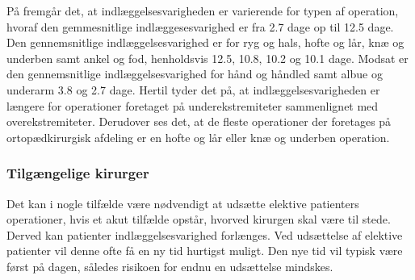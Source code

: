 \noindent
På  fremgår det, at indlæggelsesvarigheden er varierende for typen af operation, hvoraf den gemmesnitlige indlæggesesvarighed er fra 2.7 dage op til 12.5 dage.  Den gennemsnitlige  indlæggelsesvarighed er for ryg og hals, hofte og lår, knæ og underben samt ankel og fod, henholdsvis 12.5, 10.8, 10.2 og 10.1 dage. Modsat er den gennemsnitlige indlæggelsesvarighed for hånd og håndled samt albue og underarm 3.8 og 2.7 dage. Hertil tyder det på, at indlæggelsesvarigheden er længere for operationer foretaget på underekstremiteter sammenlignet med overekstremiteter. Derudover ses det, at de fleste operationer der foretages på ortopædkirurgisk afdeling er en hofte og lår eller knæ og underben operation. 

\subsubsection{Tilgængelige kirurger}
Det kan i nogle tilfælde være nødvendigt at udsætte elektive patienters operationer, hvis et akut tilfælde opstår, hvorved kirurgen skal være til stede. Derved kan patienter indlæggelsesvarighed forlænges. Ved udsættelse af elektive patienter vil denne ofte få en ny tid hurtigst muligt. Den nye tid vil typisk være først på dagen, således risikoen for endnu en udsættelse mindskes.